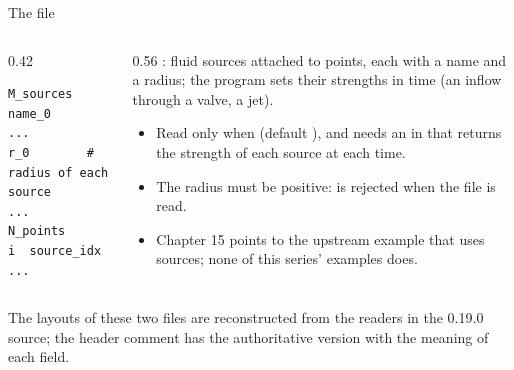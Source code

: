 \documentclass[aspectratio=169,11pt]{beamer}
\begin{document}
\begin{frame}[fragile]{The  file}
\begin{columns}[T,onlytextwidth]
\begin{column}{0.42\textwidth}
\begin{lstlisting}[style=data]
M_sources
name_0
...
r_0        # radius of each source
...
N_points
i  source_idx
...
\end{lstlisting}
\end{column}
\begin{column}{0.56\textwidth}
\small {}: fluid sources attached to points, each with a name and a radius; the program sets their strengths in time (an inflow through a valve, a jet).
\begin{itemize}
  \item Read only when  (default ), and needs an  in  that returns the strength of each source at each time.
  \item The radius must be positive:  is rejected when the file is read.
  \item Chapter 15 points to the upstream example that uses sources; none of this series' examples does.
\end{itemize}
\end{column}
\end{columns}
\vspace{1mm}
\begin{punchbox}
\small The layouts of these two files are reconstructed from the readers in the 0.19.0 source; the header comment has the authoritative version with the meaning of each field.
\end{punchbox}
\end{frame}
\end{document}
